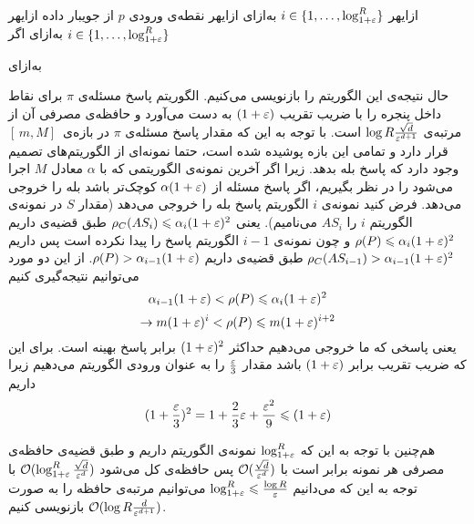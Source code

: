 ‌ازای{هر $ i \in  \{1, \ldots, \log_{1+\varepsilon}^{R} \}$ }
‌به‌ازای{}
‌ازای{هر نقطه‌ی ورودی $p$ از جویبار داده}
‌ازای{هر$ i \in  \{1, \ldots, \log_{1+\varepsilon}^{R} \}$ }
‌به‌ازای{}
‌اگر{}

‌به‌ازای{}

حال نتیجه‌ی این الگوریتم را بازنویسی می‌کنیم.
الگوریتم   پاسخ مسئله‌ی $\pi$ برای نقاط داخل پنجره را با ضریب تقریب $(1+\varepsilon)$ به دست می‌آورد و حافظه‌ی مصرفی آن از مرتبه‌ی 
$ \log R \frac{\sqrt{d}}{\varepsilon^{d+1}}$
 است.
با توجه به این که مقدار پاسخ مسئله‌ی $\pi$ در بازه‌ی $ [\, m, M]\,$ قرار دارد و تمامی این بازه پوشیده شده است، حتما نمونه‌ای از الگوریتم‌های تصمیم وجود دارد که پاسخ بله بدهد.   زیرا اگر آخرین نمونه‌ی الگوریتمی که با $\alpha$ معادل $M$ اجرا می‌شود را در نظر بگیریم، اگر پاسخ مسئله از 
$\alpha (1 +\varepsilon)$
کوچک‌تر باشد بله را خروجی می‌دهد. فرض کنید نمونه‌ی $i$ الگوریتم پاسخ بله را خروجی می‌دهد (مقدار $S$ در نمونه‌ی الگوریتم $i$ را $AS_i$ می‌نامیم). یعنی
$ \rho_C(AS_i) \leqslant \alpha_i (1 + \varepsilon) ^ 2 $
طبق قضیه‌ی  داریم
$ \rho(P) \leqslant \alpha_i (1 + \varepsilon) ^ 2 $
و چون نمونه‌ی $i-1$ الگوریتم  پاسخ را پیدا نکرده است پس داریم
$ \rho_C(AS_{i-1}) > \alpha_{i-1} (1+\varepsilon)^2$
طبق قضیه‌ی  داریم
$ \rho(P) >  \alpha_{i-1} (1 + \varepsilon) $.
از این دو مورد می‌توانیم نتیجه‌گیری کنیم
$$   \alpha_{i-1} (1 + \varepsilon) < \rho(P) \leqslant  \alpha_i (1 + \varepsilon) ^ 2  $$
$$ \rightarrow m (1+\varepsilon)^i < \rho(P) \leqslant m (1+\varepsilon)^{i+2} $$
یعنی پاسخی که ما خروجی می‌دهیم حداکثر 
$(1 + \varepsilon)^2$
برابر پاسخ بهینه است. برای این که ضریب تقریب برابر $(1+\varepsilon)$ باشد مقدار $\frac{\varepsilon}{3}$ را به عنوان ورودی الگوریتم می‌دهیم زیرا داریم
$$ (1+\frac{\varepsilon}{3})^2 = 1 + \frac{2}{3} \varepsilon + \frac{\varepsilon^2}{9} \leqslant (1+\varepsilon)$$

هم‌چنین با توجه به این که $\log_{1+\varepsilon}^{R} $ نمونه‌ی الگوریتم داریم و طبق قضیه‌ی  حافظه‌ی مصرفی هر نمونه برابر است با 
$\mathcal{O}(\frac{\sqrt{d}}{\varepsilon^d})$
  پس حافظه‌ی کل می‌شود 
$ \mathcal{O}(\log_{1+\varepsilon}^{R} \frac{\sqrt{d}}{\varepsilon^d})$
با توجه به این که می‌دانیم
$ \log_{1+\varepsilon}^{R} \leqslant \frac{\log R}{\varepsilon} $
می‌توانیم مرتبه‌ی حافظه را به صورت
$ \mathcal{O}(\log R \frac{d}{\varepsilon^{d+1}})$
بازنویسی کنیم.

